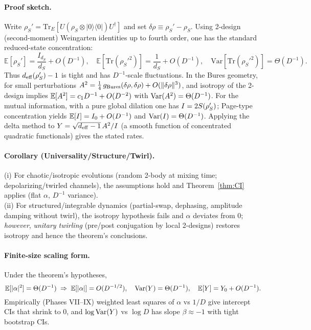 \paragraph{Proof sketch.}
Write $\rho_S' = \mathrm{Tr}_E[U(\rho_S\otimes|0\rangle\langle 0|)U^\dagger]$ and set $\delta\rho\equiv \rho_S' - \rho_S$.
Using 2-design (second-moment) Weingarten identities up to fourth order, one has the standard reduced-state concentration:
\[
\mathbb{E}[\rho_S'] = \frac{I_{d_S}}{d_S} + O(D^{-1}),\quad
\mathbb{E}[\mathrm{Tr}(\rho_S'^2)] = \frac{1}{d_S} + O(D^{-1}),\quad
\mathrm{Var}[\mathrm{Tr}(\rho_S'^2)] = \Theta(D^{-1}).
\]
Thus $d_{\mathrm{eff}}(\rho_S')-1$ is tight and has $D^{-1}$-scale fluctuations.
In the Bures geometry, for small perturbations $A^2 = \tfrac14\, g_{\mathrm{Bures}}(\delta\rho,\delta\rho) + O(\|\delta\rho\|^3)$,
and isotropy of the 2-design implies $\mathbb{E}[A^2] = c_1 D^{-1} + O(D^{-2})$ with $\mathrm{Var}(A^2)=\Theta(D^{-1})$.
For the mutual information, with a pure global dilation one has $I=2 S(\rho_S')$; Page-type concentration yields
$\mathbb{E}[I] = I_0 + O(D^{-1})$ and $\mathrm{Var}(I)=\Theta(D^{-1})$.
Applying the delta method to $Y=\sqrt{d_{\mathrm{eff}}-1}\,A^2/I$ (a smooth function of concentrated quadratic functionals) gives
the stated rates.

\paragraph{Corollary (Universality/Structure/Twirl).}
(i) For chaotic/isotropic evolutions (random 2-body at mixing time; depolarizing/twirled channels), the
assumptions hold and Theorem~\ref{thm:CI} applies (flat $\alpha$, $D^{-1}$ variance). \\
(ii) For structured/integrable dynamics (partial-swap, dephasing, amplitude damping without twirl),
the isotropy hypothesis fails and $\alpha$ deviates from $0$; \emph{however}, \emph{unitary twirling} (pre/post conjugation by local 2-designs) restores isotropy and hence the theorem’s conclusions.

\paragraph{Finite-size scaling form.}
Under the theorem’s hypotheses,
\[
\mathbb{E}[|\alpha|^2] = \Theta(D^{-1}) \;\Rightarrow\;
\mathbb{E}[|\alpha|] = O(D^{-1/2}),\quad
\mathrm{Var}(Y) = \Theta(D^{-1}),\quad
\mathbb{E}[Y] = Y_0 + O(D^{-1}).
\]
Empirically (Phases VII–IX) weighted least squares of $\alpha$ vs $1/D$ give intercept CIs that shrink to $0$,
and $\log\mathrm{Var}(Y)$ vs $\log D$ has slope $\beta \approx -1$ with tight bootstrap CIs.

